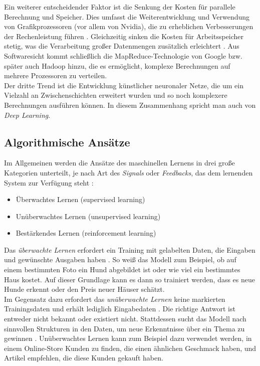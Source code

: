 \documentclass[german,bachelor]{swsLeipzig}
\begin{document}
Ein weiterer entscheidender Faktor ist die Senkung der Kosten für parallele Berechnung und Speicher.
Dies umfasst die Weiterentwicklung und Verwendung von Grafikprozessoren (vor allem von Nvidia),
die zu erheblichen Verbesserungen der Rechenleistung führen \cite[S. 1387]{FRADKOV20201385}.
Gleichzeitig sinken die Kosten für Arbeitsspeicher stetig, was die Verarbeitung großer Datenmengen zusätzlich erleichtert \cite[S. 1387]{FRADKOV20201385}.
Aus Softwaresicht kommt schließlich die MapReduce-Technologie von Google bzw. später auch Hadoop hinzu, die es ermöglicht,
komplexe Berechnungen auf mehrere Prozessoren zu verteilen\cite[S. 1387]{FRADKOV20201385}. \\

Der dritte Trend ist die Entwicklung künstlicher neuronaler Netze, die um ein Vielzahl an Zwischenschichten erweitert wurden
und so noch komplexere Berechnungen ausführen können.
In diesem Zusammenhang spricht man auch von \textit{Deep Learning}. \\

\subsection{Algorithmische Ansätze}
Im Allgemeinen werden die Ansätze des maschinellen Lernens in drei große Kategorien unterteilt, je nach Art des \textit{Signals}
oder \textit{Feedbacks}, das dem lernenden System zur Verfügung steht \cite[S. 2]{FRADKOV20201385}:
\begin{itemize}
 \item Überwachtes Lernen (supervised learning)
 \item Unüberwachtes Lernen (unsupervised learning)
 \item Bestärkendes Lernen (reinforcement learning)
\end{itemize}

Das \textit{überwachte Lernen} erfordert ein Training mit gelabelten Daten, die Eingaben und gewünschte Ausgaben haben \cite[S. 2]{cite-key}.
So weiß das Modell zum Beispiel, ob auf einem bestimmten Foto ein Hund abgebildet ist oder wie viel ein bestimmtes Haus kostet.
Auf dieser Grundlage kann es dann so trainiert werden, dass es neue Hunde erkennt oder den Preis neuer Häuser schätzt. \\

Im Gegensatz dazu erfordert das \textit{unüberwachte Lernen} keine markierten Trainingsdaten und erhält lediglich Eingabedaten \cite[S. 2]{cite-key}.
Die richtige Antwort ist entweder nicht bekannt oder existiert nicht.
Stattdessen sucht das Modell nach sinnvollen Strukturen in den Daten, um neue Erkenntnisse über ein Thema zu gewinnen \cite[S. 383]{mahesh2020machine}.
Unüberwachtes Lernen kann zum Beispiel dazu verwendet werden, in einem Online-Store Kunden zu finden, die einen ähnlichen Geschmack haben,
und Artikel empfehlen, die diese Kunden gekauft haben. \\
\end{document}
